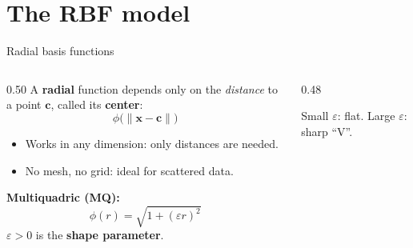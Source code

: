 \documentclass[10pt,aspectratio=169]{beamer}
\newcommand{\hl}[1]{\textcolor{accent}{\textbf{#1}}}
\newcommand{\x}{\bm{x}}
\newcommand{\cc}{\bm{c}}
\begin{document}
\section{The RBF model}

\begin{frame}{Radial basis functions}
  \begin{columns}[c]
    \begin{column}{0.50\textwidth}
      A \hl{radial} function depends only on the \emph{distance} to a point
      $\cc$, called its \textbf{center}:
      \[
        \phi\big(\lVert \x - \cc \rVert\big)
      \]
      \begin{itemize}
        \item Works in any dimension: only distances are needed.
        \item No mesh, no grid: ideal for scattered data.
      \end{itemize}
      \vspace{0.3em}
      \textbf{Multiquadric (MQ):}
      \[
        \phi(r) = \sqrt{1 + (\varepsilon r)^2}
      \]
      $\varepsilon > 0$ is the \hl{shape parameter}.
    \end{column}
    \begin{column}{0.48\textwidth}
      \centering

      {\scriptsize Small $\varepsilon$: flat. Large $\varepsilon$: sharp ``V''.}
    \end{column}
  \end{columns}
\end{frame}
\end{document}

